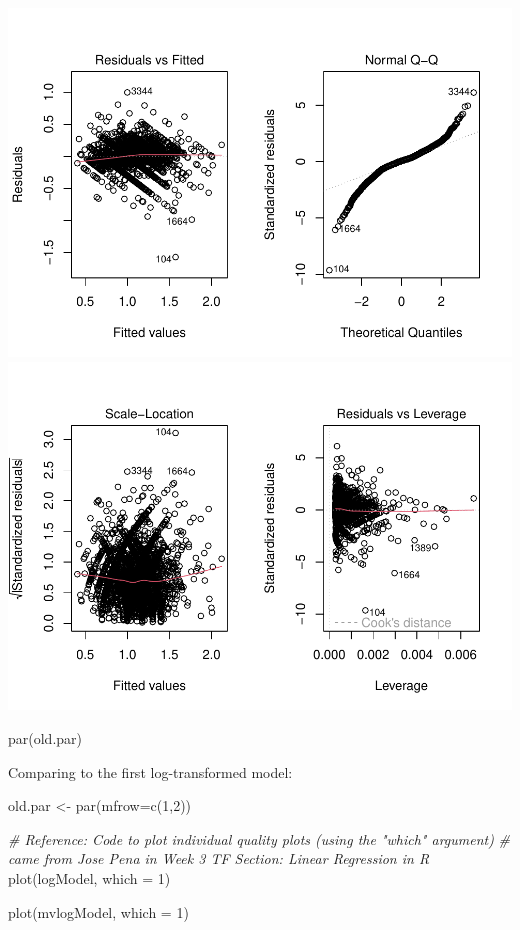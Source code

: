 \documentclass[
]{article}
\newenvironment{Shaded}{\begin{snugshade}}{\end{snugshade}}
\newcommand{\AttributeTok}[1]{\textcolor[rgb]{0.77,0.63,0.00}{#1}}
\newcommand{\CommentTok}[1]{\textcolor[rgb]{0.56,0.35,0.01}{\textit{#1}}}
\newcommand{\DecValTok}[1]{\textcolor[rgb]{0.00,0.00,0.81}{#1}}
\newcommand{\FunctionTok}[1]{\textcolor[rgb]{0.00,0.00,0.00}{#1}}
\newcommand{\NormalTok}[1]{#1}
\newcommand{\OtherTok}[1]{\textcolor[rgb]{0.56,0.35,0.01}{#1}}
\begin{document}
\includegraphics{linear_regression__uc_files/figure-latex/Problem3_Q3-1.pdf}
\includegraphics{linear_regression__uc_files/figure-latex/Problem3_Q3-2.pdf}

\begin{Shaded}
\begin{Highlighting}[]
\FunctionTok{par}\NormalTok{(old.par)}
\end{Highlighting}
\end{Shaded}

Comparing to the first log-transformed model:

\begin{Shaded}
\begin{Highlighting}[]
\NormalTok{old.par }\OtherTok{\textless{}{-}} \FunctionTok{par}\NormalTok{(}\AttributeTok{mfrow=}\FunctionTok{c}\NormalTok{(}\DecValTok{1}\NormalTok{,}\DecValTok{2}\NormalTok{))}

\CommentTok{\# Reference: Code to plot individual quality plots (using the "which" argument)}
\CommentTok{\# came from Jose Pena in Week 3 TF Section: Linear Regression in R}
\FunctionTok{plot}\NormalTok{(logModel, }\AttributeTok{which =} \DecValTok{1}\NormalTok{)}

\FunctionTok{plot}\NormalTok{(mvlogModel, }\AttributeTok{which =} \DecValTok{1}\NormalTok{)}
\end{Highlighting}
\end{Shaded}
\end{document}
